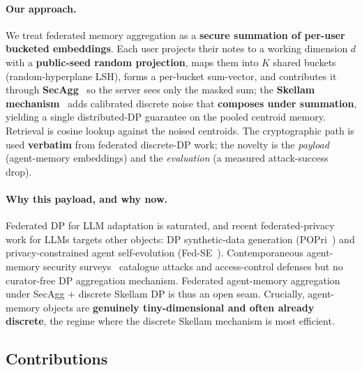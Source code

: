 \documentclass[conference]{IEEEtran}
\theoremstyle{remark}
\begin{document}
\paragraph{Our approach.} We treat federated memory aggregation as a \textbf{secure summation of per-user bucketed embeddings}. Each user projects their notes to a working dimension $d$ with a \textbf{public-seed random projection}, maps them into $K$ shared buckets (random-hyperplane LSH), forms a per-bucket sum-vector, and contributes it through \textbf{SecAgg}~\cite{bonawitz2017secagg} so the server sees only the masked sum; the \textbf{Skellam mechanism}~\cite{agarwal2021skellam} adds calibrated discrete noise that \textbf{composes under summation}, yielding a single distributed-DP guarantee on the pooled centroid memory. Retrieval is cosine lookup against the noised centroids. The cryptographic path is used \textbf{verbatim} from federated discrete-DP work; the novelty is the \emph{payload} (agent-memory embeddings) and the \emph{evaluation} (a measured attack-success drop).

\paragraph{Why this payload, and why now.} Federated DP for LLM adaptation is saturated, and recent federated-privacy work for LLMs targets other objects: DP synthetic-data generation (POPri~\cite{hou2025popri}) and privacy-constrained agent self-evolution (Fed-SE~\cite{chen2025fedse}). Contemporaneous agent-memory security surveys~\cite{lin2026survey} catalogue attacks and access-control defenses but no curator-free DP aggregation mechanism. Federated agent-memory aggregation under SecAgg $+$ discrete Skellam DP is thus an open seam. Crucially, agent-memory objects are \textbf{genuinely tiny-dimensional and often already discrete}, the regime where the discrete Skellam mechanism is most efficient.

\subsection*{Contributions}
\end{document}
